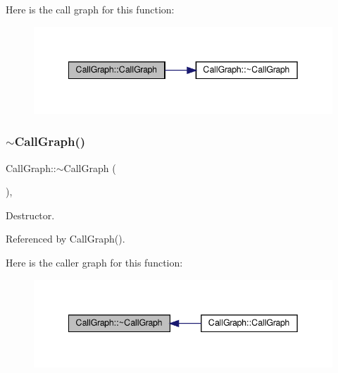 Here is the call graph for this function\+:
\nopagebreak
\begin{figure}[H]
\begin{center}
\leavevmode
\includegraphics[width=342pt]{d0/d52/classCallGraph_ae5a247b26cb929c45b75ee84290488d0_cgraph}
\end{center}
\end{figure}
\mbox{\label{classCallGraph_a1deddb919675f2c137bb30d718e69cd9}} 
\subsubsection{\texorpdfstring{$\sim$\+Call\+Graph()}{~CallGraph()}}
{\footnotesize\ttfamily Call\+Graph\+::$\sim$\+Call\+Graph (\begin{DoxyParamCaption}{ }\end{DoxyParamCaption})\hspace{0.3cm}{\ttfamily [override]}, {\ttfamily [default]}}



Destructor. 



Referenced by Call\+Graph().

Here is the caller graph for this function\+:
\nopagebreak
\begin{figure}[H]
\begin{center}
\leavevmode
\includegraphics[width=342pt]{d0/d52/classCallGraph_a1deddb919675f2c137bb30d718e69cd9_icgraph}
\end{center}
\end{figure}



